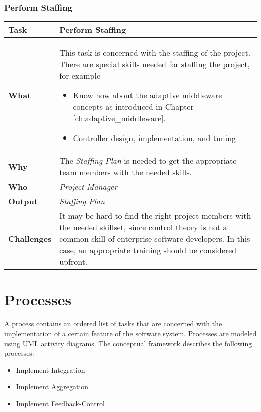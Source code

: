 \subsubsection{Perform Staffing}

\begin{tabularx}{\textwidth}{@{} l X @{}}
	\caption{Staffing} \label{table:ch6_Task_Staffing}\\
	\toprule 
	\bfseries Task & Perform Staffing\\
	\midrule 
	\bfseries What & This task is concerned with the staffing of the project. There are special skills needed for staffing the project, for example
	\begin{itemize}
		\item Know how about the adaptive middleware concepts as introduced in Chapter \ref{ch:adaptive_middleware}.
		\item Controller design, implementation, and tuning
	\end{itemize}
	\\
	\midrule 
	\bfseries Why & The \emph{Staffing Plan} is needed to get the appropriate team members with the needed skills.\\
	\midrule 
	\bfseries Who & \emph{Project Manager}\\
	\midrule 
	\bfseries Output & \emph{Staffing Plan}\\
	\midrule 
	\bfseries Challenges & It may be hard to find the right project members with the needed skillset, since control theory is not a common skill of enterprise software developers. In this case, an appropriate training should be considered upfront.\\
	\bottomrule 
\end{tabularx}

\section{Processes}
A process contains an ordered list of tasks that are concerned with the implementation of a certain feature of the software system.
Processes are modeled using \ac{UML} activity diagrams. The conceptual framework describes the following processes:
\begin{itemize}
	\item Implement Integration
	\item Implement Aggregation
	\item Implement Feedback-Control
\end{itemize}

